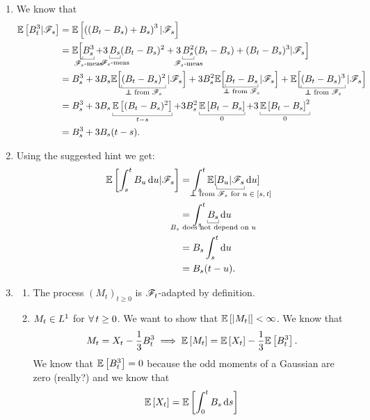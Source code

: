 \documentclass[12pt]{report}
\begin{document}
\begin{enumerate}
	\item We know that
	\begin{align*}
		\ev{B^{3}_{t}|\F_{s}}&=\ev{\left((B_{t}-B_{s})+B_{s}\right)^{3}|\F_{s}}\\
		&=\evBig{\ubracketthin{B^{3}_{s}}_{\claptext{$\F_{s}$-meas}}+3\ubracketthin{B_{s}}_{\claptext{$\F_{s}$-meas}}(B_{t}-B_{s})^{2}+3\ubracketthin{B_{s}^{2}}_{\claptext{$\F_{s}$-meas}}(B_{t}-B_{s})+(B_{t}-B_{s})^{3}|\F_{s}}\\
		&=B_{s}^{3}+3B_{s}\evBig{\ubracketthin{(B_{t}-B_{s})^{2}}_{\claptext{$\independent$ from $\F_{s}$}}|\F_{s}}+3B_{s}^{2}\evBig{\ubracketthin{B_{t}-B_{s}}_{\claptext{$\independent$ from $\F_{s}$}}|\F_{s}}+\evBig{\ubracketthin{(B_{t}-B_{s})^{3}}_{\claptext{$\independent$ from $\F_{s}$}}|\F_{s}}\\
		&=B_{s}^{3}+3B_{s}\ubracketthin{\ev{(B_{t}-B_{s})^{2}}}_{t-s}+3B_{s}^{2}\ubracketthin{\ev{B_{t}-B_{s}}}_{0}+3\ubracketthin{\ev{B_{t}-B_{s}}^{2}}_{0}\\
		&=B^{3}_{s}+3B_{s}(t-s).
	\end{align*}
	\item Using the suggested hint we get:
	\begin{align*}
		\ev{\int_{s}^{t}B_{u}\du|\F_{s}}&=\int_{s}^{t}\evs[{\ubracketthin{B_{u}|\F_{s}}_{\claptext{$\independent$ from $\F_{s}$ for $u\in[s,t]$}}\du}]\\
		&=\int_{s}^{t}\ubracketthin{B_{s}}_{\claptext{$B_{s}$ does not depend on $u$}}\du\\
		&=B_{s}\int_{s}^{t}\du\\
		&=B_{s}(t-u).
	\end{align*}
	\item \begin{enumerate}
		\item The process ${(M_{t})}_{t\geq0}$ is $\mathscr{F}_{t}$-adapted by definition.\hspace*{\fill}\faCheckCircle
		\item $M_{t}\in L^{1}$ for $\forall\, t\geq0$. We want to show that $\mathbb{E}\left[|M_{t}|\right]<\infty$. We know that
		\begin{equation*}
			M_{t}=X_{t}-\frac{1}{3}B_{t}^{3}\implies\mathbb{E}\left[M_{t}\right]=\mathbb{E}\left[X_{t}\right]-\frac{1}{3}\mathbb{E}\left[B_{t}^{3}\right].
		\end{equation*}
		We know that $\mathbb{E}\left[B_{t}^{3}\right]=0$ because the odd moments of a Gaussian are zero (really?) and we know that
		\begin{align*}
			\ev{X_{t}}&=\ev{\int_{0}^{t}B_{s}\ds}\\

\end{align*}
\end{enumerate}
\end{enumerate}
\end{document}
